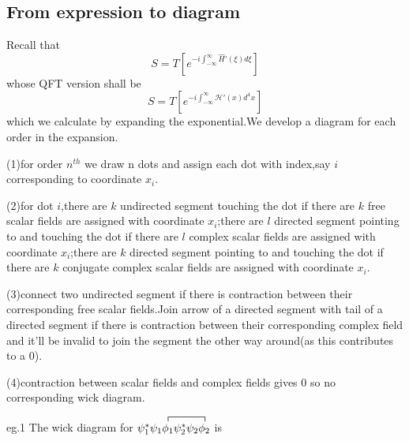\documentclass[a4paper]{article}
\begin{document}
\subsection{From expression to diagram}
Recall that$$S=T[e^{-i\int_{-\infty}^{\infty}\hat{H}'(\xi)d\xi}]$$
whose QFT version shall be$$S=T[e^{-i\int_{-\infty}^{\infty}\mathscr{H}'(x)d^4x}]$$which we calculate by expanding the exponential.We develop a diagram for each order in the expansion.
\par (1)for order $n^{th}$ we draw n dots and assign each dot with index,say $i$ corresponding to coordinate $x_i$.
\par (2)for dot $i$,there are $k$ undirected segment touching the dot  if there are $k$ free scalar fields are assigned with coordinate $x_i$;there are $l$ directed segment pointing to and touching the dot if there are $l$ complex scalar fields are assigned with coordinate $x_i$;there are $k$ directed segment pointing to and touching the dot if there are $k$ conjugate complex scalar fields are assigned with coordinate $x_i$.
\par (3)connect two undirected segment if there is contraction between their corresponding free scalar fields.Join arrow of a directed segment with tail of a directed segment if there is contraction between their corresponding complex field and it'll be invalid to join the segment the other way around(as this contributes to a 0).
\par (4)contraction between scalar fields and complex fields gives 0 so no corresponding wick diagram.
\par eg.1 The wick diagram for $\contraction{\psi_1^*\psi_1}{\phi_1}{\psi_2^*\psi_2}{\phi_2}\psi_1^*\psi_1\phi_1\psi_2^*\psi_2\phi_2$ is
\end{document}
